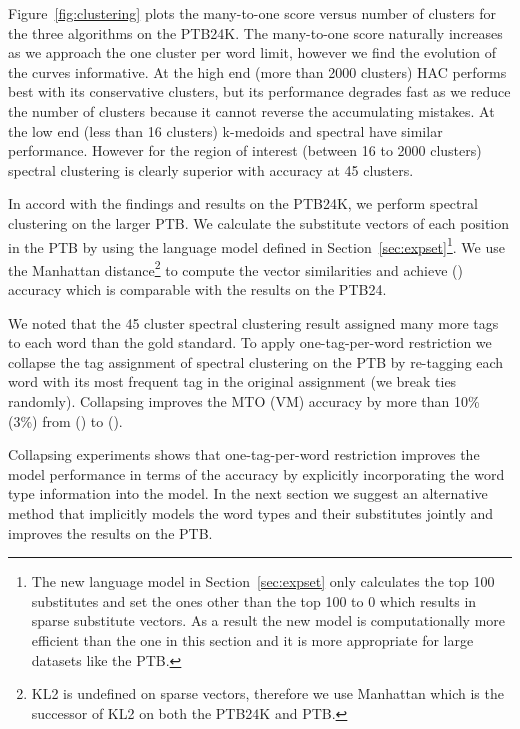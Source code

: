 Figure~\ref{fig:clustering} plots the many-to-one score versus number
of clusters for the three algorithms on the PTB24K.  The many-to-one
score naturally increases as we approach the one cluster per word
limit, however we find the evolution of the curves informative.  At
the high end (more than 2000 clusters) HAC performs best with its
conservative clusters, but its performance degrades fast as we reduce
the number of clusters because it cannot reverse the accumulating
mistakes.  At the low end (less than 16 clusters) k-medoids and
spectral have similar performance.  However for the region of interest
(between 16 to 2000 clusters) spectral clustering is clearly superior
with \spectralResult \mto accuracy at 45 clusters.

In accord with the findings and results on the PTB24K, we perform
spectral clustering on the larger PTB.  We calculate the substitute
vectors of each position in the PTB by using the language model
defined in Section~\ref{sec:expset}\footnote{The new language model in
  Section~\ref{sec:expset} only calculates the top 100 substitutes and
  set the ones other than the top 100 to 0 which results in sparse
  substitute vectors.  As a result the new model is computationally
  more efficient than the one in this section and it is more
  appropriate for large datasets like the PTB.}.  We use the Manhattan
distance\footnote{KL2 is undefined on sparse vectors, therefore we use
  Manhattan which is the successor of KL2 on both the PTB24K and PTB.}
to compute the vector similarities and achieve \spectralMtoPTB \mto
 (\collapseVmPTB \vm) accuracy which is comparable with the results
on the PTB24.

We noted that the 45 cluster spectral clustering result assigned many
more tags to each word than the gold standard.  To apply
one-tag-per-word restriction we collapse the tag assignment of
spectral clustering on the PTB by re-tagging each word with its most
frequent tag in the original assignment (we break ties randomly).
Collapsing improves the MTO (VM) accuracy by more than 10\% (3\%)
from \spectralMtoPTB (\spectralVmPTB) to \collapseMtoPTB (\collapseVmPTB).

Collapsing experiments shows that one-tag-per-word restriction
improves the model performance in terms of the \mto accuracy by
explicitly incorporating the word type information into the model.  In
the next section we suggest an alternative method that implicitly
models the word types and their substitutes jointly and improves the
results on the PTB.




